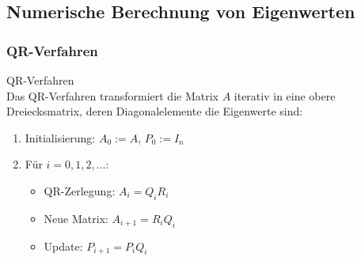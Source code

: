 \subsection{Numerische Berechnung von Eigenwerten}

\subsubsection{QR-Verfahren}

\begin{concept}{QR-Verfahren}\\
Das QR-Verfahren transformiert die Matrix $A$ iterativ in eine obere Dreiecksmatrix, deren Diagonalelemente die Eigenwerte sind:
\begin{enumerate}
    \item Initialisierung: $A_0 := A$, $P_0 := I_n$
    \item Für $i = 0,1,2,\ldots$:
    \begin{itemize}
        \item QR-Zerlegung: $A_i = Q_iR_i$
        \item Neue Matrix: $A_{i+1} = R_iQ_i$
        \item Update: $P_{i+1} = P_iQ_i$
    \end{itemize}
\end{enumerate}
\end{concept}

